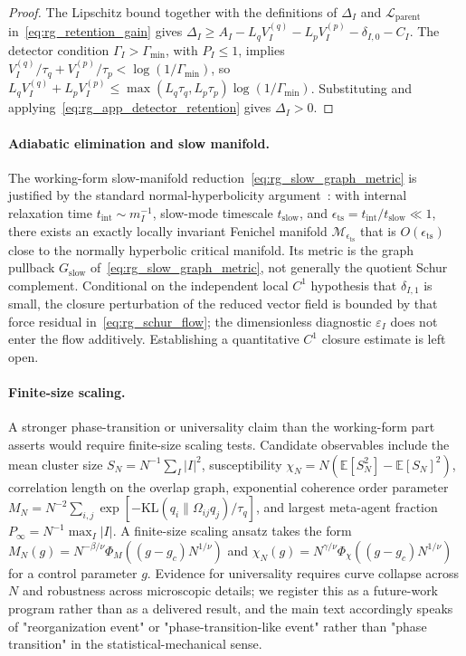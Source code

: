 \documentclass[11pt]{article}
\begin{document}
\begin{proof}
The Lipschitz bound together with the definitions of $\Delta_I$ and $\mathcal{L}_{\mathrm{parent}}$ in~\eqref{eq:rg_retention_gain} gives $\Delta_I \ge A_I - L_q V_I^{(q)} - L_p V_I^{(p)} - \delta_{I,0} - C_I$. The detector condition $\Gamma_I > \Gamma_{\min}$, with $P_I \le 1$, implies $V_I^{(q)}/\tau_q + V_I^{(p)}/\tau_p < \log(1/\Gamma_{\min})$, so $L_q V_I^{(q)} + L_p V_I^{(p)} \le \max(L_q\tau_q, L_p\tau_p)\log(1/\Gamma_{\min})$. Substituting and applying~\eqref{eq:rg_app_detector_retention} gives $\Delta_I > 0$.
\end{proof}

\paragraph{Adiabatic elimination and slow manifold.}
The working-form slow-manifold reduction~\eqref{eq:rg_slow_graph_metric} is justified by the standard normal-hyperbolicity argument~\cite{fenichel1979geometric}: with internal relaxation time $t_{\mathrm{int}} \sim m_I^{-1}$, slow-mode timescale $t_{\mathrm{slow}}$, and $\epsilon_{\mathrm{ts}}=t_{\mathrm{int}}/t_{\mathrm{slow}}\ll1$, there exists an exactly locally invariant Fenichel manifold $\mathcal{M}_{\epsilon_{\mathrm{ts}}}$ that is $O(\epsilon_{\mathrm{ts}})$ close to the normally hyperbolic critical manifold. Its metric is the graph pullback $G_{\mathrm{slow}}$ of~\eqref{eq:rg_slow_graph_metric}, not generally the quotient Schur complement. Conditional on the independent local $C^1$ hypothesis that $\delta_{I,1}$ is small, the closure perturbation of the reduced vector field is bounded by that force residual in~\eqref{eq:rg_schur_flow}; the dimensionless diagnostic $\varepsilon_I$ does not enter the flow additively. Establishing a quantitative $C^1$ closure estimate is left open.

\paragraph{Finite-size scaling.}
A stronger phase-transition or universality claim than the working-form part asserts would require finite-size scaling tests. Candidate observables include the mean cluster size $S_N = N^{-1}\sum_I |I|^2$, susceptibility $\chi_N = N(\mathbb{E}[S_N^2] - \mathbb{E}[S_N]^2)$, correlation length on the overlap graph, exponential coherence order parameter $M_N = N^{-2}\sum_{i,j}\exp[-\mathrm{KL}(q_i \| \Omega_{ij}q_j)/\tau_q]$, and largest meta-agent fraction $P_\infty = N^{-1}\max_I |I|$. A finite-size scaling ansatz takes the form $M_N(g) = N^{-\beta/\nu}\Phi_M((g - g_c)N^{1/\nu})$ and $\chi_N(g) = N^{\gamma/\nu}\Phi_\chi((g - g_c)N^{1/\nu})$ for a control parameter $g$. Evidence for universality requires curve collapse across $N$ and robustness across microscopic details; we register this as a future-work program rather than as a delivered result, and the main text accordingly speaks of "reorganization event" or "phase-transition-like event" rather than "phase transition" in the statistical-mechanical sense.
\end{document}
